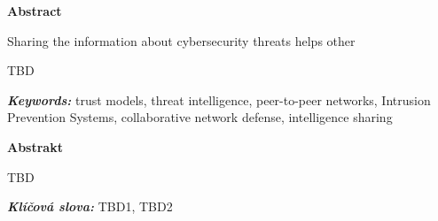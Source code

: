 \newenvironment{abstractpage}
  {\cleardoublepage\thispagestyle{empty}}
  {\vfill\cleardoublepage}
\newenvironment{abstract}[1]
  {\bigskip
   \begin{center}\bfseries#1\end{center}\small\leftskip=0.5cm\rightskip=0.5cm}
  {\par\bigskip}

\providecommand{\keywords}[2]{\footnotesize\textbf{\textit{#1:}} #2}

\begin{abstractpage}
\begin{abstract}{Abstract}
Sharing the information about cybersecurity threats helps other

    TBD 
    
\end{abstract}

\keywords{Keywords}{trust models, threat intelligence, peer-to-peer networks, Intrusion Prevention Systems, collaborative network defense, intelligence sharing}

\vspace*{\fill}

\begin{abstract}{Abstrakt}
    TBD 
    
\end{abstract}
\keywords{Klíčová slova}{TBD1, TBD2} 

\end{abstractpage}
\thispagestyle{empty}

\cleardoublepage